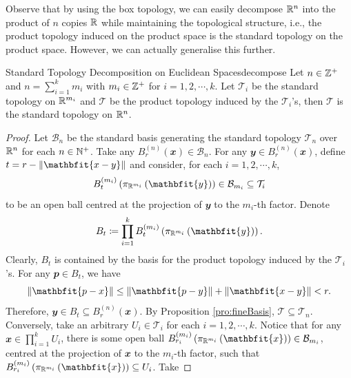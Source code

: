 \documentclass[math]{amznotes}
\theoremstyle{remark}
\begin{document}
Observe that by using the box topology, we can easily decompose $\mathbb{R}^n$ into the product of $n$ copies $\mathbb{R}$ while maintaining the topological structure, i.e., the product topology induced on the product space is the standard topology on the product space. However, we can actually generalise this further.
\begin{probox}{Standard Topology Decomposition on Euclidean Spaces}{decompose}
    Let $n \in \mathbb{Z}^+$ and $n = \sum_{i = 1}^km_i$ with $m_i \in \mathbb{Z}^+$ for $i = 1, 2, \cdots, k$. Let $\mathcal{T}_i$ be the standard topology on $\mathbb{R}^{m_i}$ and $\mathcal{T}$ be the product topology induced by the $\mathcal{T}_i$'s, then $\mathcal{T}$ is the standard topology on $\mathbb{R}^n$.
    \tcblower
    \begin{proof}
        Let $\mathcal{B}_n$ be the standard basis generating the standard topology $\mathcal{T}_n$ over $\mathbb{R}^n$ for each $n \in \mathbb{N}^+$. Take any $B_r^{\left(n\right)}\left(\mathbfit{x}\right) \in \mathcal{B}_n$. For any $\mathbfit{y} \in B_r^{\left(n\right)}\left(\mathbfit{x}\right)$, define $t = r - \norm{\mathbfit{x - y}}$ and consider, for each $i = 1, 2, \cdots, k$,
        \begin{equation*}
            B_t^{\left(m_i\right)}\left(\pi_{\R^{m_i}}\left(\mathbfit{y}\right)\right) \in \mathcal{B}_{m_i} \subseteq \mathcal{T}_i
        \end{equation*}
        to be an open ball centred at the projection of $\mathbfit{y}$ to the $m_i$-th factor. Denote 
        \begin{equation*}
            B_t \coloneqq \prod_{i = 1}^{k}B_t^{\left(m_i\right)}\left(\pi_{\R^{m_i}}\left(\mathbfit{y}\right)\right).
        \end{equation*}
        Clearly, $B_t$ is contained by the basis for the product topology induced by the $\mathcal{T}_i$'s. For any $\mathbfit{p} \in B_t$, we have 
        \begin{equation*}
            \norm{\mathbfit{p - x}} \leq \norm{\mathbfit{p - y}} + \norm{\mathbfit{x - y}} < r.
        \end{equation*} 
        Therefore, $\mathbfit{y} \in B_t \subseteq B_r^{\left(n\right)}\left(\mathbfit{x}\right)$. By Proposition \ref{pro:fineBasis}, $\mathcal{T} \subseteq \mathcal{T}_n$. Conversely, take an arbitrary $U_i \in \mathcal{T}_i$ for each $i = 1, 2, \cdots, k$. Notice that for any $\mathbfit{x} \in \prod_{i = 1}^kU_i$, there is some open ball $B_{r_i}^{\left(m_i\right)}\left(\pi_{\R^{m_i}}\left(\mathbfit{x}\right)\right) \in \mathcal{B}_{m_i}$, centred at the projection of $\mathbfit{x}$ to the $m_i$-th factor, such that $B_{r_i}^{\left(m_i\right)}\left(\pi_{\R^{m_i}}\left(\mathbfit{x}\right)\right) \subseteq U_i$. Take

\end{proof}
\end{probox}
\end{document}
